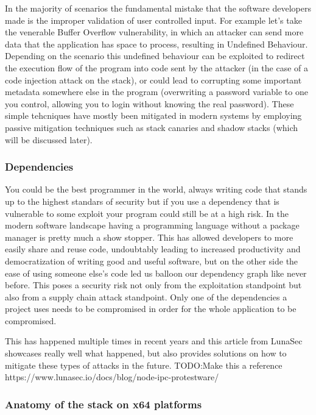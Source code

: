 \documentclass{article}
\begin{document}
In the majority of scenarios the fundamental mistake that the software
developers made is the improper validation of user controlled input. For example
let's take the venerable Buffer Overflow vulnerability, in which an attacker can
send more data that the application has space to process, resulting in Undefined
Behaviour. Depending on the scenario this undefined behaviour can be exploited
to redirect the execution flow of the program into code sent by the attacker (in
the case of a code injection attack on the stack), or could lead to corrupting
some important metadata somewhere else in the program (overwriting a password
variable to one you control, allowing you to login without knowing the real
password). These simple tehcniques have mostly been mitigated in modern systems
by employing passive mitigation techniques such as stack canaries and shadow
stacks (which will be discussed later).

\subsubsection{Dependencies}%

You could be the best programmer in the world, always writing code that stands
up to the highest standars of security but if you use a dependency that is
vulnerable to some exploit your program could still be at a high risk. In the
modern software landscape having a programming language without a package
manager is pretty much a show stopper. This has allowed developers to more
easily share and reuse code, undoubtably leading to increased productivity and
democratization of writing good and useful software, but on the other side the
ease of using someone else's code led us balloon our dependency graph like never
before. This poses a security risk not only from the exploitation standpoint but
also from a supply chain attack standpoint. Only one of the dependencies a
project uses needs to be compromised in order for the whole application to be
compromised.

This has happened multiple times in recent years and this article from LunaSec
showcases really well what happened, but also provides solutions on how to
mitigate these types of attacks in the future.
TODO:Make this a reference
https://www.lunasec.io/docs/blog/node-ipc-protestware/

\subsubsection{Anatomy of the stack on x64 platforms}%
\end{document}
